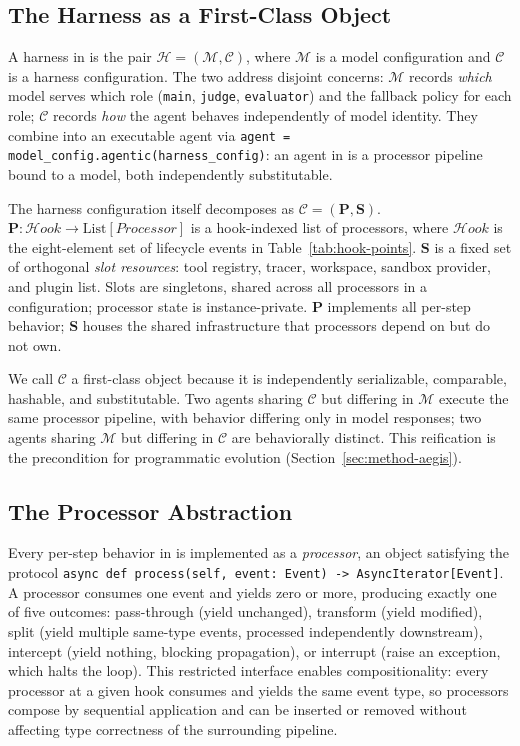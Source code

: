 \subsection{The Harness as a First-Class Object}
\label{sec:foundry-object}

A harness in \ProjectName is the pair $\mathcal{H} = (\mathcal{M}, \mathcal{C})$, where $\mathcal{M}$ is a model configuration and $\mathcal{C}$ is a harness configuration. The two address disjoint concerns: $\mathcal{M}$ records \textit{which} model serves which role (\texttt{main}, \texttt{judge}, \texttt{evaluator}) and the fallback policy for each role; $\mathcal{C}$ records \textit{how} the agent behaves independently of model identity. They combine into an executable agent via \texttt{agent = model\_config.agentic(harness\_config)}: an agent in \ProjectName is a processor pipeline bound to a model, both independently substitutable.

The harness configuration itself decomposes as $\mathcal{C} = (\mathbf{P}, \mathbf{S})$. $\mathbf{P} : \mathcal{H}\!\mathit{ook} \to \mathrm{List}[\mathit{Processor}]$ is a hook-indexed list of processors, where $\mathcal{H}\!\mathit{ook}$ is the eight-element set of lifecycle events in Table~\ref{tab:hook-points}. $\mathbf{S}$ is a fixed set of orthogonal \textit{slot resources}: tool registry, tracer, workspace, sandbox provider, and plugin list. Slots are singletons, shared across all processors in a configuration; processor state is instance-private. $\mathbf{P}$ implements all per-step behavior; $\mathbf{S}$ houses the shared infrastructure that processors depend on but do not own.

We call $\mathcal{C}$ a first-class object because it is independently serializable, comparable, hashable, and substitutable. Two agents sharing $\mathcal{C}$ but differing in $\mathcal{M}$ execute the same processor pipeline, with behavior differing only in model responses; two agents sharing $\mathcal{M}$ but differing in $\mathcal{C}$ are behaviorally distinct. This reification is the precondition for programmatic evolution (Section~\ref{sec:method-aegis}).

\subsection{The Processor Abstraction}
\label{sec:foundry-processor}

Every per-step behavior in \ProjectName is implemented as a \textit{processor}, an object satisfying the protocol \texttt{async def process(self, event: Event) -> AsyncIterator[Event]}. A processor consumes one event and yields zero or more, producing exactly one of five outcomes: pass-through (yield unchanged), transform (yield modified), split (yield multiple same-type events, processed independently downstream), intercept (yield nothing, blocking propagation), or interrupt (raise an exception, which halts the loop). This restricted interface enables compositionality: every processor at a given hook consumes and yields the same event type, so processors compose by sequential application and can be inserted or removed without affecting type correctness of the surrounding pipeline.

